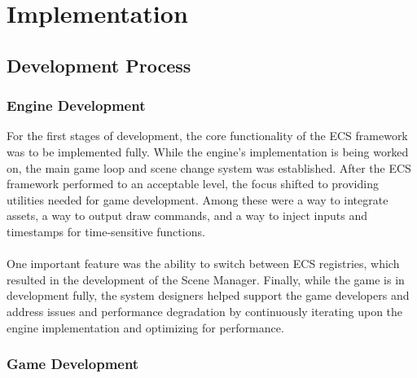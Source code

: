 \section{Implementation}
\label{sec:implementation}

\subsection{Development Process}
\label{subsec:development-process}

\subsubsection*{Engine Development}

For the first stages of development, the core functionality of the ECS framework was to be implemented fully.
While the engine's implementation is being worked on, the main game loop and scene change system was established.
After the ECS framework performed to an acceptable level, the focus shifted to providing utilities
needed for game development.
Among these were a way to integrate assets, a way to output draw commands, and a way to inject inputs and timestamps for
time-sensitive functions.
\\\\
One important feature was the ability to switch between ECS registries, which resulted in the development of the Scene Manager.
Finally, while the game is in development fully, the system designers helped support the game developers and address
issues and performance degradation by continuously iterating upon the engine implementation and optimizing for performance.

\subsubsection*{Game Development}

